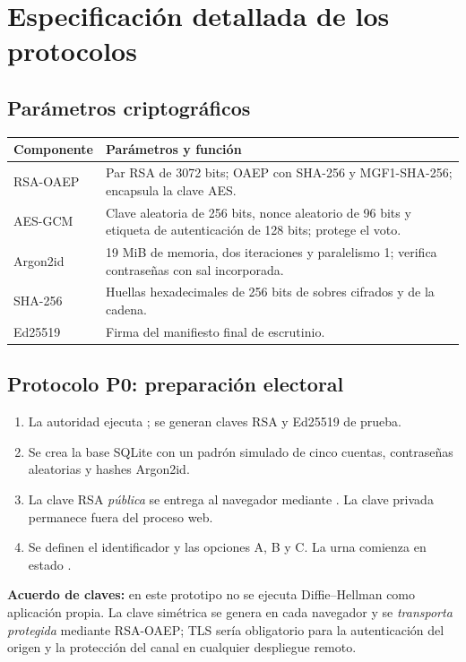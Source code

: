 \section{Especificación detallada de los protocolos}
\subsection{Parámetros criptográficos}
\begin{center}\small
\begin{tabularx}{\linewidth}{p{4cm}X}
\toprule Componente & Parámetros y función\\\midrule
RSA-OAEP & Par RSA de 3072 bits; OAEP con SHA-256 y MGF1-SHA-256; encapsula la clave AES.\\
AES-GCM & Clave aleatoria de 256 bits, nonce aleatorio de 96 bits y etiqueta de autenticación de 128 bits; protege el voto.\\
Argon2id & 19 MiB de memoria, dos iteraciones y paralelismo 1; verifica contraseñas con sal incorporada.\\
SHA-256 & Huellas hexadecimales de 256 bits de sobres cifrados y de la cadena.\\
Ed25519 & Firma del manifiesto final de escrutinio.\\
\bottomrule
\end{tabularx}
\end{center}

\subsection{Protocolo P0: preparación electoral}
\begin{enumerate}
\item La autoridad ejecuta ; se generan claves RSA y Ed25519 de prueba.
\item Se crea la base SQLite con un padrón simulado de cinco cuentas, contraseñas aleatorias y hashes Argon2id.
\item La clave RSA \emph{pública} se entrega al navegador mediante . La clave privada permanece fuera del proceso web.
\item Se definen el identificador  y las opciones A, B y C. La urna comienza en estado .
\end{enumerate}
\textbf{Acuerdo de claves:} en este prototipo no se ejecuta Diffie--Hellman como aplicación propia. La clave simétrica se genera en cada navegador y se \emph{transporta protegida} mediante RSA-OAEP; TLS sería obligatorio para la autenticación del origen y la protección del canal en cualquier despliegue remoto.

